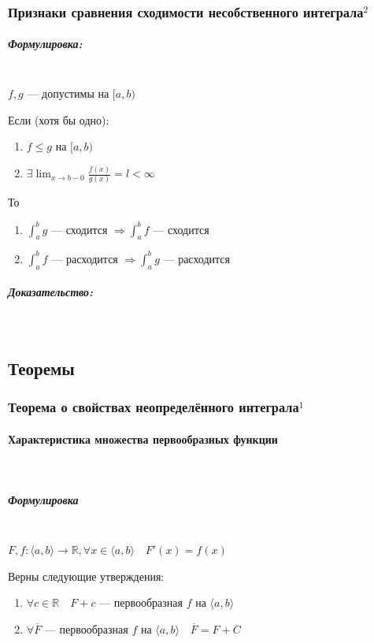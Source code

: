 \documentclass{article}
\let\vanillaparagraph\paragraph
\let\vanillasubparagraph\subparagraph
\renewcommand{\paragraph}[1]{\vanillaparagraph{#1}\mbox{}\\}
\renewcommand{\subparagraph}[1]{\vanillasubparagraph{#1}\mbox{}\\}
\begin{document}
\subsubsection{Признаки сравнения сходимости несобственного интеграла\texorpdfstring{$^2$}{}}
\subparagraph{Формулировка:}

$f, g$ --- допустимы на $[a, b)$

Если (хотя бы одно):
\begin{enumerate}
    \item $f \le g$ на $[a, b)$
    \item $\exists \lim_{x \rightarrow b - 0} {\frac{f(x)}{g(x)}} = l < \infty$
\end{enumerate}

То
\begin{enumerate}
    \item $\int_a^b g$ --- сходится $\Rightarrow \int_a^b f$ --- сходится
    \item $\int_a^b f$ --- расходится $\Rightarrow \int_a^b g$ --- расходится
\end{enumerate}

\subparagraph{Доказательство:}



\newpage

\subsection{Теоремы}
\subsubsection{Теорема о свойствах неопределённого интеграла\texorpdfstring{$^1$}{}}
\paragraph{Характеристика множества первообразных функции}
\subparagraph{Формулировка}

$F, f: \langle a, b\rangle \rightarrow \mathbb{R}, \forall x \in \langle a, b\rangle \quad F'(x) = f(x)$

Верны следующие утверждения:
\begin{enumerate}
    \item $\forall c \in \mathbb{R} \quad F + c$ --- первообразная $f$ на $\langle a, b \rangle$
    \item $\forall \overline{F}$ --- первообразная $f$ на $\langle a, b\rangle \quad \overline{F} = F + C$
\end{enumerate}
\end{document}
